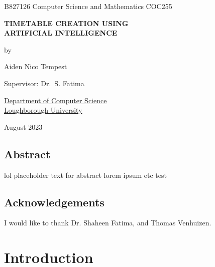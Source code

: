 \documentclass[a4paper, 12pt]{report}
\begin{document}
\graphicspath{{../doc-imgs/}}

\thispagestyle{empty}
\begin{center}
	\Large{
		B827126 \hfill Computer Science and Mathematics \hfill COC255
	}
	\vspace*{\fill}

	\Large{\textbf{TIMETABLE CREATION USING\\ARTIFICIAL INTELLIGENCE}}

	\vspace*{\fill}

	by

	\vspace*{\fill}

	Aiden Nico Tempest

	\vspace*{\fill}

	Supervisor: Dr.\ S. Fatima

	\vspace*{\fill}

	\underline{Department of Computer Science} \\ \underline{Loughborough
	University}

	\vspace*{\fill}
	
	August 2023

\end{center} %

\newpage

\restoregeometry

\section*{Abstract} %
lol placeholder text for abstract lorem ipsum etc test

\section*{Acknowledgements}

I would like to thank Dr. Shaheen Fatima, and Thomas Venhuizen.

\tableofcontents
{}

\newpage

\chapter{Introduction} %
\end{document}
